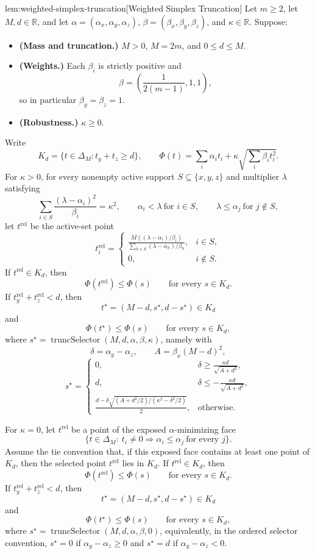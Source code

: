 \documentclass[11pt]{article}
\begin{document}
\begin{lemmav}{lem:weighted-simplex-truncation}[Weighted Simplex Truncation]
Let \(m\ge 2\), let \(M,d\in\mathbb R\), and let \(\alpha=(\alpha_x,\alpha_y,\alpha_z)\), \(\beta=(\beta_x,\beta_y,\beta_z)\), and \(\kappa\in\mathbb R\). Suppose:
\begin{itemize}
\item \textbf{(Mass and truncation.)} \(M>0\), \(M=2m\), and \(0\le d\le M\).
\item \textbf{(Weights.)} Each \(\beta_i\) is strictly positive and
\[
\beta=\left(\frac{1}{2(m-1)},1,1\right),
\]
so in particular \(\beta_y=\beta_z=1\).
\item \textbf{(Robustness.)} \(\kappa\ge 0\).
\end{itemize}
Write
\[
K_d=\{t\in\Delta_M:t_y+t_z\ge d\},
\qquad
\Phi(t)=\sum_i\alpha_i t_i+\kappa\sqrt{\sum_i\beta_i t_i^2}.
\]
For \(\kappa>0\), for every nonempty active support \(S\subseteq\{x,y,z\}\) and multiplier \(\lambda\) satisfying
\[
\sum_{i\in S}\frac{(\lambda-\alpha_i)^2}{\beta_i}=\kappa^2,\qquad
\alpha_i<\lambda\ \text{for }i\in S,\qquad
\lambda\le \alpha_j\ \text{for }j\notin S,
\]
let \(t^{\mathrm{rel}}\) be the active-set point
\[
t^{\mathrm{rel}}_i=
\begin{cases}
\displaystyle
\frac{M((\lambda-\alpha_i)/\beta_i)}
{\sum_{h\in S}(\lambda-\alpha_h)/\beta_h}, & i\in S,\\[1em]
0, & i\notin S .
\end{cases}
\]
If \(t^{\mathrm{rel}}\in K_d\), then
\[
\Phi(t^{\mathrm{rel}})\le \Phi(s)
\qquad\text{for every }s\in K_d.
\]
If \(t^{\mathrm{rel}}_y+t^{\mathrm{rel}}_z<d\), then
\[
t^\star=(M-d,s^\star,d-s^\star)\in K_d
\]
and
\[
\Phi(t^\star)\le \Phi(s)
\qquad\text{for every }s\in K_d,
\]
where \(s^\star=\operatorname{truncSelector}(M,d,\alpha,\beta,\kappa)\), namely with
\[
\delta=\alpha_y-\alpha_z,\qquad A=\beta_x(M-d)^2,
\]
\[
s^\star=
\begin{cases}
0, & \displaystyle \delta\ge \frac{\kappa d}{\sqrt{A+d^2}},\\[0.8em]
d, & \displaystyle \delta\le -\frac{\kappa d}{\sqrt{A+d^2}},\\[0.8em]
\displaystyle
\frac{d-\delta\sqrt{(A+d^2/2)/(\kappa^2-\delta^2/2)}}{2},
& \text{otherwise.}
\end{cases}
\]

For \(\kappa=0\), let \(t^{\mathrm{rel}}\) be a point of the exposed \(\alpha\)-minimizing face
\[
\{t\in\Delta_M:\ t_i\ne 0\Rightarrow \alpha_i\le \alpha_j\ \text{for every }j\}.
\]
Assume the tie convention that, if this exposed face contains at least one point of \(K_d\), then the selected point \(t^{\mathrm{rel}}\) lies in \(K_d\). If \(t^{\mathrm{rel}}\in K_d\), then
\[
\Phi(t^{\mathrm{rel}})\le \Phi(s)
\qquad\text{for every }s\in K_d.
\]
If \(t^{\mathrm{rel}}_y+t^{\mathrm{rel}}_z<d\), then
\[
t^\star=(M-d,s^\star,d-s^\star)\in K_d
\]
and
\[
\Phi(t^\star)\le \Phi(s)
\qquad\text{for every }s\in K_d,
\]
where \(s^\star=\operatorname{truncSelector}(M,d,\alpha,\beta,0)\), equivalently, in the ordered selector convention, \(s^\star=0\) if \(\alpha_y-\alpha_z\ge 0\) and \(s^\star=d\) if \(\alpha_y-\alpha_z<0\).
\end{lemmav}
\end{document}
